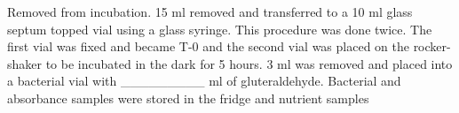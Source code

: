 Removed from incubation. 15 ml removed and transferred to a 10 ml glass septum topped vial using a glass syringe. This procedure was done twice. The first vial was fixed and became T-0 and the second vial was placed on the rocker-shaker to be incubated in the dark for 5 hours. 3 ml was removed and placed into a bacterial vial with _________ ml of gluteraldehyde. Bacterial and absorbance samples were stored in the fridge and nutrient samples  